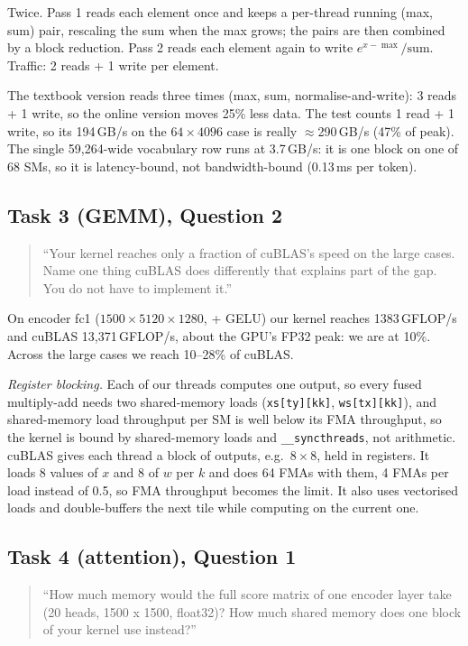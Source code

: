 \documentclass{article}
\begin{document}
Twice. Pass 1 reads each element once and keeps a per-thread running
(max, sum) pair, rescaling the sum when the max grows; the pairs are then
combined by a block reduction. Pass 2 reads each element again to write
$e^{x-\max}/\mathrm{sum}$. Traffic: 2 reads + 1 write per element.

The textbook version reads three times (max, sum, normalise-and-write): 3 reads
+ 1 write, so the online version moves 25\% less data. The test counts 1 read + 1
write, so its 194\,GB/s on the $64 \times 4096$ case is really
$\approx$290\,GB/s (47\% of peak). The single 59{,}264-wide vocabulary row runs
at 3.7\,GB/s: it is one block on one of 68 SMs, so it is latency-bound, not
bandwidth-bound (0.13\,ms per token).

\subsection{Task 3 (GEMM), Question 2}
\begin{quote}
``Your kernel reaches only a fraction of cuBLAS's speed on the large cases. Name one
thing cuBLAS does differently that explains part of the gap. You do not have to
implement it.''
\end{quote}

On encoder fc1 ($1500 \times 5120 \times 1280$, + GELU) our kernel reaches
1383\,GFLOP/s and cuBLAS 13{,}371\,GFLOP/s, about the GPU's FP32 peak: we are at
10\%. Across the large cases we reach 10--28\% of cuBLAS.

\emph{Register blocking.} Each of our threads computes one output, so every
fused multiply-add needs two shared-memory loads (\texttt{xs[ty][kk]},
\texttt{ws[tx][kk]}), and shared-memory load throughput per SM is well below
its FMA throughput, so the kernel is bound by shared-memory loads and
\texttt{\_\_syncthreads}, not arithmetic. cuBLAS gives each thread a block of outputs, e.g.\
$8 \times 8$, held in registers. It loads 8 values of $x$ and 8 of $w$ per $k$
and does 64 FMAs with them, 4 FMAs per load instead of 0.5, so FMA throughput
becomes the limit. It also uses vectorised loads and double-buffers the next
tile while computing on the current one.

\subsection{Task 4 (attention), Question 1}
\begin{quote}
``How much memory would the full score matrix of one encoder layer take (20 heads,
1500 x 1500, float32)? How much shared memory does one block of your kernel use
instead?''
\end{quote}
\end{document}
